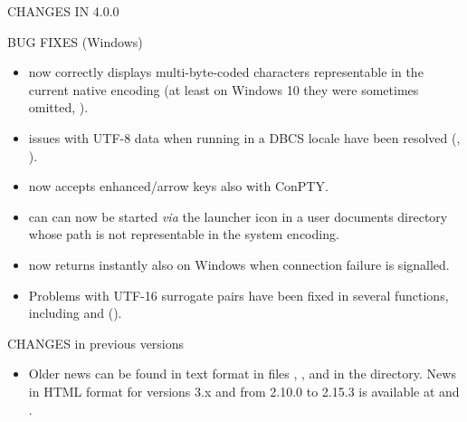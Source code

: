 \documentclass[letterpaper]{book}
\begin{document}
\begin{Section}{ CHANGES IN 4.0.0}
\begin{SubSection}{BUG FIXES (Windows)}
\begin{itemize}
\item{}  now correctly displays
multi-byte-coded characters representable in the current native
encoding (at least on Windows 10 they were sometimes omitted,
).

\item{}  issues with UTF-8 data when running in a DBCS
locale have been resolved (, ).

\item{}  now accepts enhanced/arrow keys also with
ConPTY.

\item{} \R{} can can now be started \emph{via} the launcher icon in a
user documents directory whose path is not representable in the
system encoding.

\item{}  now returns instantly
also on Windows when connection failure is signalled.

\item{} Problems with UTF-16 surrogate pairs have been fixed in
several functions, including  and
 ().

\end{itemize}


\end{SubSection}

\end{Section}
%
\begin{Section}{CHANGES in previous versions}
\begin{itemize}

\item{} Older news can be found in text format in files
, ,
 and 
in the  directory.  News in HTML format for
\R{}  versions 3.x and from 2.10.0 to 2.15.3 is available at
and
.

\end{itemize}

\end{Section}
\end{document}
